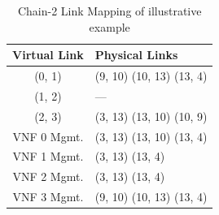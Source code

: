\begin{table}
    \centering
    \caption{Chain-2 Link Mapping of illustrative example}
    \begin{tabular}{|c|l|}
        \hline
        Virtual Link & Physical Links \\
        \hline
        (0, 1) & (9, 10) (10, 13) (13, 4) \\
        \hline
        (1, 2) & --- \\
        \hline
        (2, 3) & (3, 13) (13, 10) (10, 9) \\
        \hline
        VNF 0 Mgmt. & (3, 13) (13, 10) (13, 4) \\
        \hline
        VNF 1 Mgmt. & (3, 13) (13, 4) \\
        \hline
        VNF 2 Mgmt. & (3, 13) (13, 4) \\
        \hline
        VNF 3 Mgmt. & (9, 10) (10, 13) (13, 4) \\
        \hline
    \end{tabular}
    \label{tbl:example-chain-2-links}
\end{table}